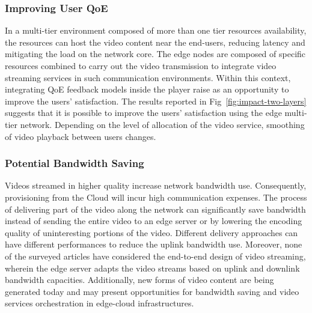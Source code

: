 \subsubsection{Improving User QoE}

In a multi-tier environment composed of more than one tier resources availability, the resources can host the video content near the end-users, reducing latency and mitigating the load on the network core. The edge nodes are composed of specific resources combined to carry out the video transmission to integrate video streaming services in such communication environments. Within this context, integrating QoE feedback models inside the player raise as an opportunity to improve the users' satisfaction.%
The results reported in Fig~\ref{fig:impact-two-layers} suggests that it is possible to improve the users' satisfaction using the edge multi-tier network. Depending on the level of allocation of the video service, smoothing of video playback between users changes.%

\subsubsection{Potential Bandwidth Saving}

Videos streamed in higher quality increase network bandwidth use. Consequently, provisioning from the Cloud will incur high communication expenses. 
The process of delivering part of the video along the network can significantly save bandwidth instead of sending the entire video to an edge server or by lowering the encoding quality of uninteresting portions of the video. Different delivery approaches can have different performances to reduce the uplink bandwidth use. Moreover, none of the surveyed articles have considered the end-to-end design of video streaming, wherein the edge server adapts the video streams based on uplink and downlink bandwidth capacities. Additionally, new forms of video content are being generated today and may present opportunities for bandwidth saving and video services orchestration in edge-cloud infrastructures.


